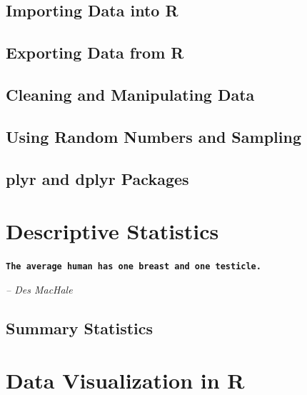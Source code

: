 \documentclass[11pt, letterpaper, twoside]{memoir}\usepackage{knitr}
\newcommand{\chapterendsymbol}{
    \vspace{24pt}
    \Huge
    \hrulefill \hspace{0.1in} \hspace{0.1in} \hrulefill
    \normalsize
    }
\begin{document}
\section{Importing Data into R}


\section{Exporting Data from R}

\section{Cleaning and Manipulating Data}


\section{Using Random Numbers and Sampling}


\section{plyr and dplyr Packages}

\chapterendsymbol





\chapter{Descriptive Statistics}

\begin{flushright}

\textbf{\texttt{The average human has one breast and one testicle.}}

\emph{-- Des MacHale}

\end{flushright}

\vspace{12pt}


\section{Summary Statistics}


\chapterendsymbol





\chapter{Data Visualization in R}
\end{document}
